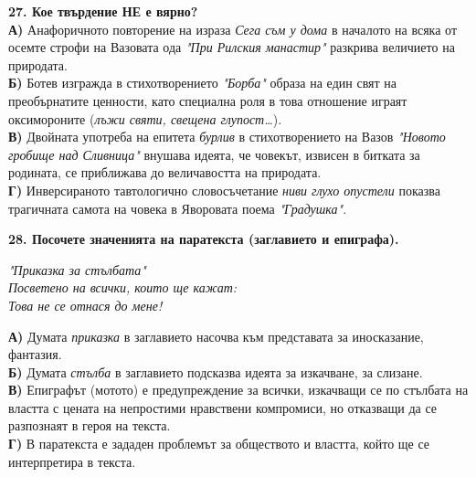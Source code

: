 \documentclass[12pt,a4paper]{article}
\begin{document}
\vspace{0.6cm}

\noindent
\textbf{27. Кое твърдение НЕ е вярно?} \\
\noindent
\textbf{А)} Анафоричното повторение на израза \textit{Сега съм у дома} в началото на всяка от осемте строфи на Вазовата ода \textit{"При Рилския манастир"} разкрива величието на природата. \\
\textbf{Б)} Ботев изгражда в стихотворението \textit{"Борба"} образа на един свят на преобърнатите ценности, като специална роля в това отношение играят оксимороните (\textit{лъжи святи, свещена глупост\dots}). \\
\textbf{В)} Двойната употреба на епитета \textit{бурлив} в стихотворението на Вазов \textit{"Новото гробище над Сливница"} внушава идеята, че човекът, извисен в битката за родината, се приближава до величавостта на природата. \\
\textbf{Г)} Инверсираното тавтологично словосъчетание \textit{ниви глухо опустели} показва трагичната самота на човека в Яворовата поема \textit{"Градушка"}.

\vspace{0.6cm}

\noindent
\textbf{28. Посочете значенията на паратекста (заглавието и епиграфа).} \\[0.5em]
\begin{flushright}
    \textit{"Приказка за стълбата"} \\
    \textit{Посветено на всички, които ще кажат:} \\
    \textit{Това не се отнася до мене!}
\end{flushright}
\vspace{0.4cm}
\noindent
\textbf{А)} Думата \textit{приказка} в заглавието насочва към представата за иносказание, фантазия. \\
\textbf{Б)} Думата \textit{стълба} в заглавието подсказва идеята за изкачване, за слизане. \\
\textbf{В)} Епиграфът (мотото) е предупреждение за всички, изкачващи се по стълбата на властта с цената на непростими нравствени компромиси, но отказващи да се разпознаят в героя на текста. \\
\textbf{Г)} В паратекста е зададен проблемът за обществото и властта, който ще се интерпретира в текста.

\vspace{0.6cm}
\end{document}
